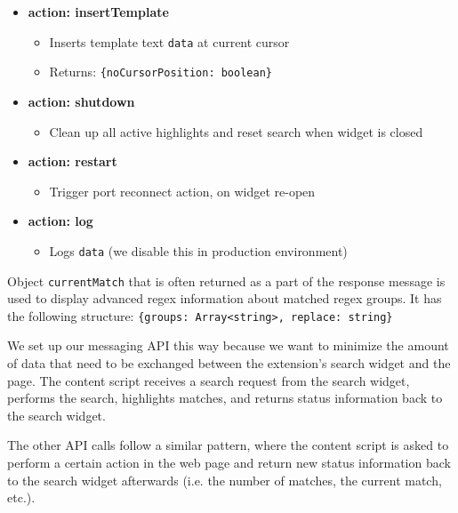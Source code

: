 \documentclass[bsc,frontabs,twoside,singlespacing,parskip,deptreport]{infthesis}
\providecommand{\tightlist}{%
  \setlength{\itemsep}{0pt}\setlength{\parskip}{0pt}}
\begin{document}
\begin{itemize}
\item\textbf{action: insertTemplate}

\begin{itemize}
\tightlist
\item
  Inserts template text \texttt{data} at current cursor
\item
  Returns: \texttt{\{noCursorPosition:\ boolean\}}
\end{itemize}

\item\textbf{action: shutdown}

\begin{itemize}
\tightlist
\item
  Clean up all active highlights and reset search when widget is closed
\end{itemize}

\item\textbf{action: restart}

\begin{itemize}
\tightlist
\item
  Trigger port reconnect action, on widget re-open
\end{itemize}

\item\textbf{action: log}

\begin{itemize}
\tightlist
\item
  Logs \texttt{data} (we disable this in production environment) 
\end{itemize}
\end{itemize}

Object \texttt{currentMatch} that is often returned as a part of the response message is used to display advanced regex information about matched regex groups. It has the following structure:
\texttt{\{groups:\ Array\textless{}string\textgreater{},\ replace:\ string\}}

We set up our messaging API this way because we want to minimize the amount of data that need to be exchanged between the extension's search widget and the page. The content script receives a search request from the search widget, performs the search, highlights matches, and returns status information back to the search widget. 

The other API calls follow a similar pattern, where the content script is asked to perform a certain action in the web page and return new status information back to the search widget afterwards (i.e. the number of matches, the current match, etc.).
\end{document}
